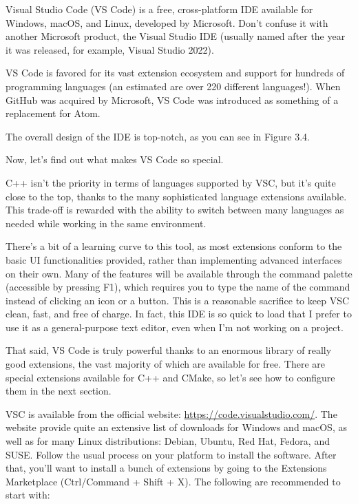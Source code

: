 
Visual Studio Code (VS Code) is a free, cross-platform IDE available for Windows, macOS, and Linux, developed by Microsoft. Don’t confuse it with another Microsoft product, the Visual Studio IDE (usually named after the year it was released, for example, Visual Studio 2022).

VS Code is favored for its vast extension ecosystem and support for hundreds of programming languages (an estimated are over 220 different languages!). When GitHub was acquired by Microsoft, VS Code was introduced as something of a replacement for Atom.

The overall design of the IDE is top-notch, as you can see in Figure 3.4.


Now, let’s find out what makes VS Code so special.


C++ isn’t the priority in terms of languages supported by VSC, but it’s quite close to the top, thanks to the many sophisticated language extensions available. This trade-off is rewarded with the ability to switch between many languages as needed while working in the same environment.

There’s a bit of a learning curve to this tool, as most extensions conform to the basic UI functionalities provided, rather than implementing advanced interfaces on their own. Many of the features will be available through the command palette (accessible by pressing F1), which requires you to type the name of the command instead of clicking an icon or a button. This is a reasonable sacrifice to keep VSC clean, fast, and free of charge. In fact, this IDE is so quick to load that I prefer to use it as a general-purpose text editor, even when I’m not working on a project.

That said, VS Code is truly powerful thanks to an enormous library of really good extensions, the vast majority of which are available for free. There are special extensions available for C++ and CMake, so let’s see how to configure them in the next section.


VSC is available from the official website: \url{https://code.visualstudio.com/}. The website provide quite an extensive list of downloads for Windows and macOS, as well as for many Linux distributions: Debian, Ubuntu, Red Hat, Fedora, and SUSE. Follow the usual process on your platform to install the software. After that, you’ll want to install a bunch of extensions by going to the Extensions Marketplace (Ctrl/Command + Shift + X). The following are recommended to start with:

